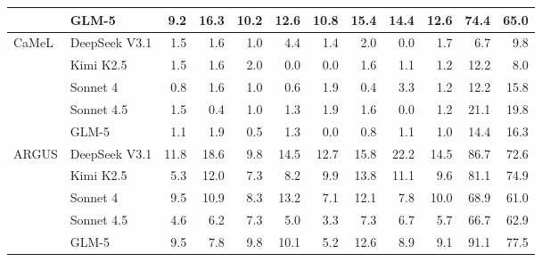 \begin{table}[htbp]
{\begin{tabular}{@{}llrrrrrrrrrr@{}}
 & GLM-5 & 9.2 & 16.3 & 10.2 & 12.6 & 10.8 & 15.4 & 14.4 & 12.6 & 74.4 & 65.0 \\
\midrule
CaMeL & DeepSeek V3.1 & 1.5 & 1.6 & 1.0 & 4.4 & 1.4 & 2.0 & 0.0 & 1.7 & 6.7 & 9.8 \\
 & Kimi K2.5 & 1.5 & 1.6 & 2.0 & 0.0 & 0.0 & 1.6 & 1.1 & 1.2 & 12.2 & 8.0 \\
 & Sonnet 4 & 0.8 & 1.6 & 1.0 & 0.6 & 1.9 & 0.4 & 3.3 & 1.2 & 12.2 & 15.8 \\
 & Sonnet 4.5 & 1.5 & 0.4 & 1.0 & 1.3 & 1.9 & 1.6 & 0.0 & 1.2 & 21.1 & 19.8 \\
 & GLM-5 & 1.1 & 1.9 & 0.5 & 1.3 & 0.0 & 0.8 & 1.1 & 1.0 & 14.4 & 16.3 \\
\midrule
ARGUS & DeepSeek V3.1 & 11.8 & 18.6 & 9.8 & 14.5 & 12.7 & 15.8 & 22.2 & 14.5 & 86.7 & 72.6 \\
 & Kimi K2.5 & 5.3 & 12.0 & 7.3 & 8.2 & 9.9 & 13.8 & 11.1 & 9.6 & 81.1 & 74.9 \\
 & Sonnet 4 & 9.5 & 10.9 & 8.3 & 13.2 & 7.1 & 12.1 & 7.8 & 10.0 & 68.9 & 61.0 \\
 & Sonnet 4.5 & 4.6 & 6.2 & 7.3 & 5.0 & 3.3 & 7.3 & 6.7 & 5.7 & 66.7 & 62.9 \\
 & GLM-5 & 9.5 & 7.8 & 9.8 & 10.1 & 5.2 & 12.6 & 8.9 & 9.1 & 91.1 & 77.5 \\
\bottomrule
\end{tabular}
}
\endgroup
\end{table}

